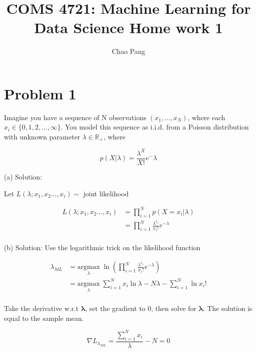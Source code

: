 \documentclass[11pt]{report}
\begin{document}
\title{COMS 4721: Machine Learning for Data Science 
Home work 1}
\author{Chao Pang}
 
\maketitle

\section{Problem 1}
Imagine you have a sequence of N observations $(x_1,...,x_N)$, where each $x_i \in \{0,1,2,...,\infty\}$. You
model this sequence as i.i.d. from a Poisson distribution with unknown parameter $\lambda \in \mathbb{R}_+$, where

\[ p(X|\lambda) = \frac{ \lambda^X}{X!}e^-\lambda \]

\justify
(a) Solution: 

\begin{center}
Let $L(\lambda; x_1, x_2 ..., x_i)  \sim$ joint likelihood
\end{center}

\begin{equation*}
\begin{split}
L(\lambda; x_1, x_2 ..., x_i)  & = \prod_{i=1}^N p(X=x_i| \lambda) \\
&  = \prod_{i=1}^N\frac{\lambda^{x_i}}{x_i!} e^{-\lambda} \\
\end{split}
\end{equation*}


\justify
(b) Solution: 
Use the logarithmic trick on the likelihood function

\begin{equation*}
\begin{split}
\lambda_{ML} & = \underset{\lambda}{\mathrm{argmax}} \; \ln{(\prod_{i=1}^N\frac{\lambda^{x_i}}{x_i!} e^{-\lambda})} \\
& = \underset{\lambda}{\mathrm{argmax}} \; {\sum_{i=1}^N{x_i}\ln{\lambda} }  - {N\lambda}  -  {\sum_{i=1}^N\ln{x_i!}}\\
\end{split}
\end{equation*}

\justify
Take the derivative w.r.t $\boldsymbol{\lambda}$, set the gradient to 0, then solve for $\boldsymbol{\lambda}$. The solution is equal to the sample mean. 

\begin{equation*}
\nabla{L_{\lambda_{ML}}} = {\frac{\sum_{i=1}^N{x_i}}{\lambda}} - N = 0
\end{equation*}
\end{document}
